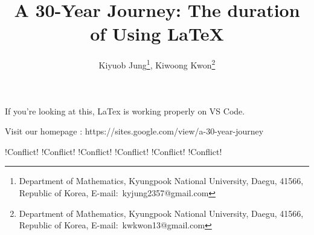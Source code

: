 \documentclass[a4paper,11pt]{article}
\title{
    A 30-Year Journey: The duration of Using LaTeX
    }
\author{
    Kiyuob Jung\thanks{Department of Mathematics, Kyungpook National University, Daegu, 41566, Republic of Korea, E-mail:~kyjung2357@gmail.com},
    Kiwoong Kwon\thanks{Department of Mathematics, Kyungpook National University, Daegu, 41566, Republic of Korea, E-mail:~kwkwon13@gmail.com}
    }
\begin{document}
\date{}
\maketitle

If you're looking at this, LaTex is working properly on VS Code.

Visit our homepage : https://sites.google.com/view/a-30-year-journey

!Conflict! !Conflict! !Conflict! !Conflict! !Conflict! !Conflict!
\end{document}
